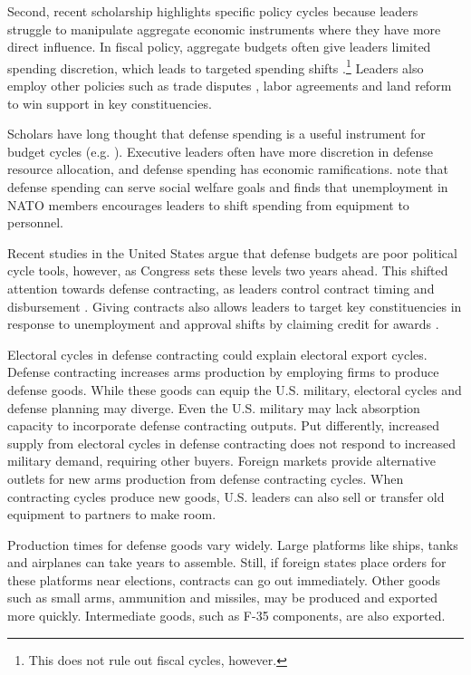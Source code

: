 \documentclass[12pt]{article}
\begin{document}
Second, recent scholarship highlights specific policy cycles because leaders struggle to manipulate aggregate economic instruments where they have more direct influence. 
In fiscal policy, aggregate budgets often give leaders limited spending discretion, which leads to targeted spending shifts \citep[pg. 248]{Dubois2016}.\footnote{This does not rule out fiscal cycles, however.} 
Leaders also employ other policies such as trade disputes \citep{Conconietal2017}, labor agreements \citep{Ahlquist2010} and land reform \cite{Philips2020} to win support in key constituencies.


Scholars have long thought that defense spending is a useful instrument for budget cycles (e.g. \cite{Tufte1978, Mintz1988}).
Executive leaders often have more discretion in defense resource allocation, and defense spending has economic ramifications.
\citet{WhittenWilliams2011} note that defense spending can serve social welfare goals and \citet{Becker2021} finds that unemployment in NATO members encourages leaders to shift spending from equipment to personnel.


Recent studies in the United States argue that defense budgets are poor political cycle tools, however, as Congress sets these levels two years ahead.
This shifted attention towards defense contracting, as leaders control contract timing and disbursement \citep{Mayer1995, DerouenHeo2000}.
Giving contracts also allows leaders to target key constituencies in response to unemployment and approval shifts by claiming credit for awards \citep{DerouenHeo2000}. 


Electoral cycles in defense contracting could explain electoral export cycles.
Defense contracting increases arms production by employing firms to produce defense goods. 
While these goods can equip the U.S. military, electoral cycles and defense planning may diverge.
Even the U.S. military may lack absorption capacity to incorporate defense contracting outputs.
Put differently, increased supply from electoral cycles in defense contracting does not respond to increased military demand, requiring other buyers. 
Foreign markets provide alternative outlets for new arms production from defense contracting cycles. 
When contracting cycles produce new goods, U.S. leaders can also sell or transfer old equipment to partners to make room.


Production times for defense goods vary widely.
Large platforms like ships, tanks and airplanes can take years to assemble. 
Still, if foreign states place orders for these platforms near elections, contracts can go out immediately.
Other goods such as small arms, ammunition and missiles, may be produced and exported more quickly. 
Intermediate goods, such as F-35 components, are also exported. 
\end{document}
